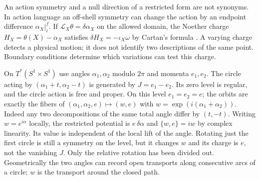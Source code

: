An action symmetry and a null direction of a restricted form are not synonyms. In action language an off-shell symmetry can change the action by an endpoint difference $\alpha_X|_i^f$. If $\mathcal L_X\theta=\delta\alpha_X$ on the allowed domain, the Noether charge $H_X=\theta(X)-\alpha_X$ satisfies $\delta H_X=-\iota_X\omega$ by Cartan's formula \cite{HW}. A varying charge detects a physical motion; it does not identify two descriptions of the same point. Boundary conditions determine which variations can test this charge.

\begin{example}\label{f:two-rotor}
On $T^*(S^1\times S^1)$ use angles $\alpha_1,\alpha_2$ modulo $2\pi$ and momenta $e_1,e_2$. The circle acting by $(\alpha_1+t,\alpha_2-t)$ is generated by $J=e_1-e_2$. Its zero level is regular, and the circle action is free and proper. On this level $e_1=e_2=e$; the orbits are exactly the fibers of $(\alpha_1,\alpha_2,e)\mapsto(w,e)$ with $w=\exp(i(\alpha_1+\alpha_2))$. Indeed any two decompositions of the same total angle differ by $(t,-t)$. Writing $w=e^{i\alpha}$ locally, the restricted potential is $e\,\delta\alpha$ and $\{w,e\}=iw$ by complex linearity. Its value is independent of the local lift of the angle. Rotating just the first circle is still a symmetry on the level, but it changes $w$ and its charge is $e$, not the vanishing $J$. Only the relative rotation has been divided out. Geometrically the two angles can record open transports along consecutive arcs of a circle; $w$ is the transport around the closed path.
\end{example}

